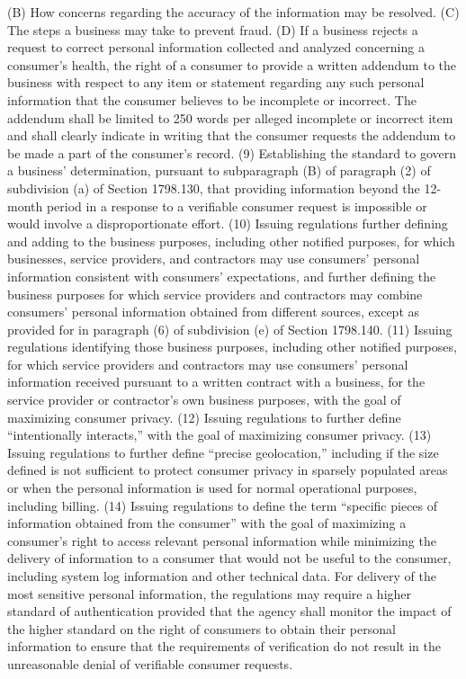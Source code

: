 (B) How concerns regarding the accuracy of the information may be resolved.
(C) The steps a business may take to prevent fraud.
(D) If a business rejects a request to correct personal information collected and analyzed concerning a consumer’s health, the right of a consumer to provide a written addendum to the business with respect to any item or statement regarding any such personal information that the consumer believes to be incomplete or incorrect. The addendum shall be limited to 250 words per alleged incomplete or incorrect item and shall clearly indicate in writing that the consumer requests the addendum to be made a part of the consumer’s record.
(9) Establishing the standard to govern a business’ determination, pursuant to subparagraph (B) of paragraph (2) of subdivision (a) of Section 1798.130, that providing information beyond the 12-month period in a response to a verifiable consumer request is impossible or would involve a disproportionate effort.
(10) Issuing regulations further defining and adding to the business purposes, including other notified purposes, for which businesses, service providers, and contractors may use consumers’ personal information consistent with consumers’ expectations, and further defining the business purposes for which service providers and contractors may combine consumers’ personal information obtained from different sources, except as provided for in paragraph (6) of subdivision (e) of Section 1798.140.
(11) Issuing regulations identifying those business purposes, including other notified purposes, for which service providers and contractors may use consumers’ personal information received pursuant to a written contract with a business, for the service provider or contractor’s own business purposes, with the goal of maximizing consumer privacy.
(12) Issuing regulations to further define “intentionally interacts,” with the goal of maximizing consumer privacy.
(13) Issuing regulations to further define “precise geolocation,” including if the size defined is not sufficient to protect consumer privacy in sparsely populated areas or when the personal information is used for normal operational purposes, including billing.
(14) Issuing regulations to define the term “specific pieces of information obtained from the consumer” with the goal of maximizing a consumer’s right to access relevant personal information while minimizing the delivery of information to a consumer that would not be useful to the consumer, including system log information and other technical data. For delivery of the most sensitive personal information, the regulations may require a higher standard of authentication provided that the agency shall monitor the impact of the higher standard on the right of consumers to obtain their personal information to ensure that the requirements of verification do not result in the unreasonable denial of verifiable consumer requests.
